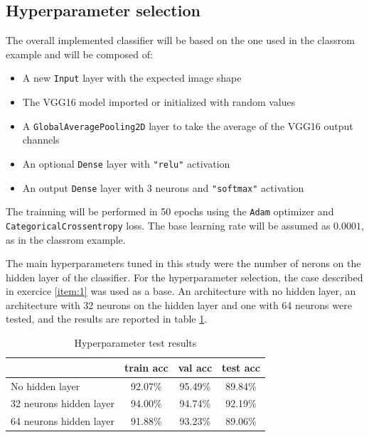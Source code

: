 \documentclass[10pt, a4paper]{article}
\begin{document}
\subsection{Hyperparameter selection}

The overall implemented classifier will be based on the one used in the classrom example and will be composed of:

\begin{itemize}
  \item A new {\tt Input} layer with the expected image shape
  \item The VGG16 model imported or initialized with random values
  \item A {\tt GlobalAveragePooling2D} layer to take the average of the VGG16 output channels
  \item An optional {\tt Dense} layer with {\tt "relu"} activation
  \item An output {\tt Dense} layer with 3 neurons and {\tt "softmax"} activation
\end{itemize}

The trainning will be performed in 50 epochs using the {\tt Adam} optimizer and {\tt CategoricalCrossentropy} loss.
The base learning rate will be assumed as $0.0001$, as in the classrom example.

The main hyperparameters tuned in this study were the number of nerons on the hidden layer of the classifier. 
For the hyperparameter selection, the case described in exercice \ref{item:1} was used as a base. An architecture 
with no hidden layer, an architecture with 32 neurons on the hidden layer and one with 64 neurons were tested, and 
the results are reported in table \ref{tab:hp_search}.

\begin{table}[htpb]
  \centering
  \begin{tabular}{l|c|c|c|}
                            & train acc  & val acc  & test acc\\
    \hline
    No hidden layer         & 92.07\%    & 95.49\%  & 89.84\% \\
    32 neurons hidden layer & 94.00\%    & 94.74\%  & 92.19\% \\
    64 neurons hidden layer & 91.88\%    & 93.23\%  & 89.06\% \\
    \hline
  \end{tabular}
  \caption{Hyperparameter test results}
  \label{tab:hp_search}
\end{table}
\end{document}
